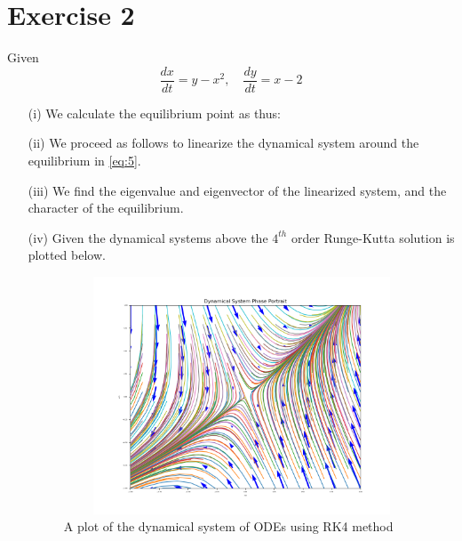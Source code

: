 \documentclass[12pt,a4paper]{article}
\begin{document}
\section*{Exercise 2}
Given 
\begin{equation}
		\frac{dx}{dt} =  y - x^2, \quad
		\frac{dy}{dt} = x -2
		\label{eq:5}
\end{equation}
\begin{enumerate}
							\item[(i)]   We calculate the equilibrium point as thus:
							\item[(ii)]We proceed as follows to linearize the dynamical system around the equilibrium in \eqref{eq:5}.
							\item[(iii)] We find the eigenvalue and eigenvector of the linearized system,  and the character of the equilibrium.
							\item[(iv)] Given the dynamical systems above the $4^{th}$ order Runge-Kutta solution is plotted below.

					\begin{figure}[!h]
									\includegraphics[width=430pt,  height=200pt]{./graphics/q002_a.png}
										\caption{A plot of the dynamical system of ODEs using RK4 method}
										\label{fig:q5}
								\end{figure}
\end{enumerate}
\end{document}
